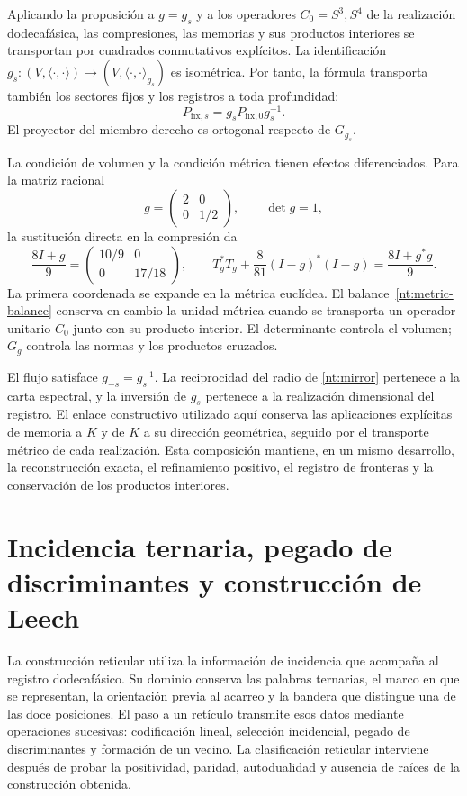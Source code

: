 \documentclass[a4paper,10pt]{article}
\theoremstyle{definition}\newtheorem{definition}[theorem]{Definición}
\theoremstyle{remark}\newtheorem{remark}[theorem]{Observación}
\numberwithin{equation}{section}
\begin{document}
Aplicando la proposición a \(g=g_s\) y a los operadores
\(C_0=S^3,S^4\) de la realización dodecafásica, las
compresiones, las memorias y sus productos interiores
se transportan por cuadrados conmutativos explícitos.
La identificación \(g_s:(V,\langle\cdot,\cdot\rangle)
\to(V,\langle\cdot,\cdot\rangle_{g_s})\) es isométrica.
Por tanto, la fórmula transporta también los sectores
fijos y los registros a toda profundidad:
\[
 P_{\mathrm{fix},s}
 =g_sP_{\mathrm{fix},0}g_s^{-1}.
\]
El proyector del miembro derecho es ortogonal respecto
de \(G_{g_s}\).

La condición de volumen y la condición métrica tienen
efectos diferenciados. Para la matriz racional
\[
 g=\begin{pmatrix}2&0\\0&1/2\end{pmatrix},
 \qquad \det g=1,
\]
la sustitución directa en la compresión da
\[
 \frac{8I+g}{9}
 =\begin{pmatrix}10/9&0\\0&17/18\end{pmatrix},
 \qquad
 T_g^*T_g+\frac8{81}(I-g)^*(I-g)
 =\frac{8I+g^*g}{9}.
\]
La primera coordenada se expande en la métrica
euclídea. El balance~\eqref{nt:metric-balance}
conserva en cambio la unidad métrica cuando se
transporta un operador unitario \(C_0\) junto con
su producto interior. El determinante controla
el volumen; \(G_g\) controla las normas y los
productos cruzados.

El flujo satisface \(g_{-s}=g_s^{-1}\).
La reciprocidad del radio de
\eqref{nt:mirror} pertenece a la carta espectral,
y la inversión de \(g_s\) pertenece a la
realización dimensional del registro. El enlace
constructivo utilizado aquí conserva las
aplicaciones explícitas de memoria a \(K\) y de
\(K\) a su dirección geométrica, seguido por
el transporte métrico de cada realización.
Esta composición mantiene, en un mismo desarrollo,
la reconstrucción exacta, el refinamiento positivo,
el registro de fronteras y la conservación
de los productos interiores.

\section{Incidencia ternaria, pegado de discriminantes y construcción de Leech}
\label{sec:lf-foundations}

La construcción reticular utiliza la información de incidencia que
acompaña al registro dodecafásico. Su dominio conserva las palabras
ternarias, el marco en que se representan, la orientación previa al
acarreo y la bandera que distingue una de las doce posiciones. El
paso a un retículo transmite esos datos mediante operaciones
sucesivas: codificación lineal, selección incidencial, pegado de
discriminantes y formación de un vecino. La clasificación reticular
interviene después de probar la positividad, paridad, autodualidad
y ausencia de raíces de la construcción obtenida.
\end{document}
